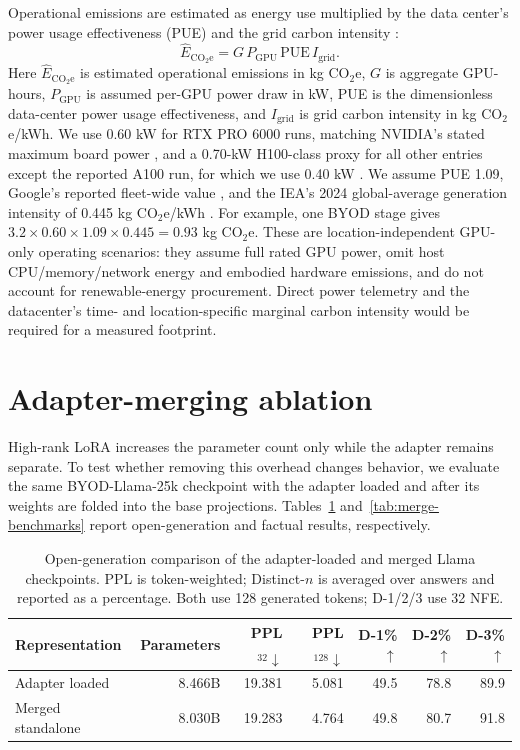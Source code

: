\documentclass{article}
\begin{document}
Operational emissions are estimated as energy use multiplied by the data center's power usage effectiveness (PUE) and the grid carbon intensity \citep{lannelongue2021green,patterson2021carbon}:
\begin{equation}
\widehat{E}_{\mathrm{CO_2e}}=G\,P_{\mathrm{GPU}}\,\mathrm{PUE}\,I_{\mathrm{grid}}.
\end{equation}
Here $\widehat{E}_{\mathrm{CO_2e}}$ is estimated operational emissions in kg CO$_2$e, $G$ is aggregate GPU-hours, $P_{\mathrm{GPU}}$ is assumed per-GPU power draw in kW, PUE is the dimensionless data-center power usage effectiveness, and $I_{\mathrm{grid}}$ is grid carbon intensity in kg CO$_2$e/kWh. We use 0.60 kW for RTX PRO 6000 runs, matching NVIDIA's stated maximum board power \citep{nvidiaRTXPro6000}, and a 0.70-kW H100-class proxy for all other entries except the reported A100 run, for which we use 0.40 kW \citep{nvidiaH100,nvidiaA100}. We assume PUE 1.09, Google's reported fleet-wide value \citep{googlePUE2025}, and the IEA's 2024 global-average generation intensity of 0.445 kg CO$_2$e/kWh \citep{ieaElectricity2025}. For example, one BYOD stage gives $3.2\times0.60\times1.09\times0.445=0.93$ kg CO$_2$e. These are location-independent GPU-only operating scenarios: they assume full rated GPU power, omit host CPU/memory/network energy and embodied hardware emissions, and do not account for renewable-energy procurement. Direct power telemetry and the datacenter's time- and location-specific marginal carbon intensity would be required for a measured footprint.

\section{Adapter-merging ablation}
\label{app:merge}

High-rank LoRA increases the parameter count only while the adapter remains separate. To test whether removing this overhead changes behavior, we evaluate the same BYOD-Llama-25k checkpoint with the adapter loaded and after its weights are folded into the base projections. Tables~\ref{tab:merge-open-generation} and~\ref{tab:merge-benchmarks} report open-generation and factual results, respectively.

\begin{table}[h]
\caption{Open-generation comparison of the adapter-loaded and merged Llama checkpoints. PPL is token-weighted; Distinct-$n$ is averaged over answers and reported as a percentage. Both use 128 generated tokens; D-1/2/3 use 32 NFE.}
\label{tab:merge-open-generation}
\centering
\scriptsize
\begin{tabular}{lrrrrrr}
\toprule
Representation & Parameters & PPL$_{32}\downarrow$ & PPL$_{128}\downarrow$ & D-1\%$\uparrow$ & D-2\%$\uparrow$ & D-3\%$\uparrow$ \\
\midrule
Adapter loaded & 8.466B & 19.381 & 5.081 & 49.5 & 78.8 & 89.9 \\
Merged standalone & 8.030B & 19.283 & 4.764 & 49.8 & 80.7 & 91.8 \\
\bottomrule
\end{tabular}
\end{table}
\end{document}

